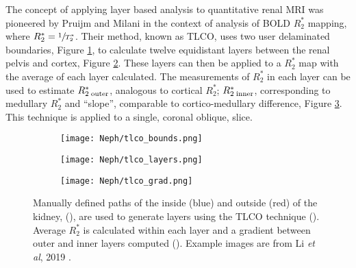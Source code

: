 The concept of applying layer based analysis to quantitative renal \ac{MRI} was pioneered by Pruijm and Milani \cite{piskunowicz_new_2015, milani_reduction_2017, pruijm_blood_2017, li_renal_2019} in the context of analysis of \ac{BOLD} $R_2^*$ mapping, where $R_2^*=\sfrac{1}{T_2^*}$. Their method, known as \ac{TLCO}, uses two user delaminated boundaries, Figure \ref{fig:ex_tlco_bounds}, to calculate twelve equidistant layers between the renal pelvis and cortex, Figure \ref{fig:ex_tlco_layers}. These layers can then be applied to a $R_2^*$ map with the average of each layer calculated. The measurements of $R_2^*$ in each layer can be used to estimate $R_{2\;\textup{outer}}^*$, analogous to cortical $R_2^*$; $R_{2\;\textup{inner}}^*$, corresponding to medullary $R_2^*$ and ``slope'', comparable to  cortico-medullary difference, Figure \ref{fig:ex_tlco_grad}. This technique is applied to a single, coronal oblique, slice.

\begin{figure}[H]
	\centering
	\begin{subfigure}[c]{0.23\textwidth}
		\centering
		\texttt{[image: Neph/tlco\_bounds.png]}
		\caption{}
		\label{fig:ex_tlco_bounds}
	\end{subfigure}
	\hfill
	\begin{subfigure}[c]{0.23\textwidth}
		\centering
		\texttt{[image: Neph/tlco\_layers.png]}
		\caption{}
		\label{fig:ex_tlco_layers}
	\end{subfigure}
	\hfill
	\begin{subfigure}[c]{0.47\textwidth}
		\centering
		\texttt{[image: Neph/tlco\_grad.png]}
		\caption{}
		\label{fig:ex_tlco_grad}
	\end{subfigure}
	\caption{Manually defined paths of the inside (blue) and outside (red) of the kidney, (), are used to generate layers using the \ac{TLCO} technique (). Average $R_2^*$ is calculated within each layer and a gradient between outer and inner layers computed (). Example images are from Li \textit{et al}, 2019 \cite{li_renal_2019}.}
	\label{fig:ex_tlco}
\end{figure}

